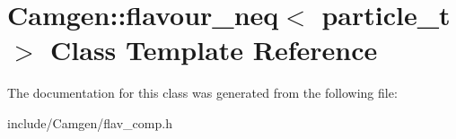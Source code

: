 \hypertarget{a00232}{}\section{Camgen\+:\+:flavour\+\_\+neq$<$ particle\+\_\+t $>$ Class Template Reference}
\label{a00232}


The documentation for this class was generated from the following file\+:\begin{DoxyCompactItemize}
\item 
include/\+Camgen/flav\+\_\+comp.\+h\end{DoxyCompactItemize}
